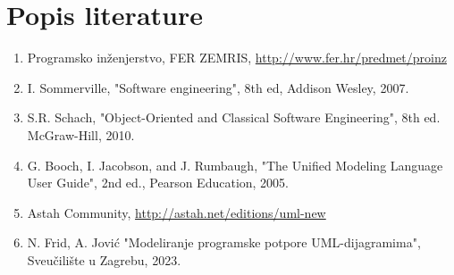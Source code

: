 \chapter*{Popis literature}
	 	

		
		\begin{enumerate}
			
			
			\item  Programsko inženjerstvo, FER ZEMRIS, \url{http://www.fer.hr/predmet/proinz}
			
			\item  I. Sommerville, "Software engineering", 8th ed, Addison Wesley, 2007.
			
			\item  S.R. Schach, "Object-Oriented and			Classical Software			Engineering", 8th ed. McGraw-Hill, 2010.
			
			\item  G. Booch, I. Jacobson, and J. Rumbaugh, "The Unified			Modeling Language			User Guide", 2nd ed., Pearson Education, 2005.
			
			\item  Astah Community, \url{http://astah.net/editions/uml-new}
			
			\item N. Frid, A. Jović "Modeliranje programske potpore UML-dijagramima", Sveučilište u Zagrebu, 2023.

		\end{enumerate}
		
		 